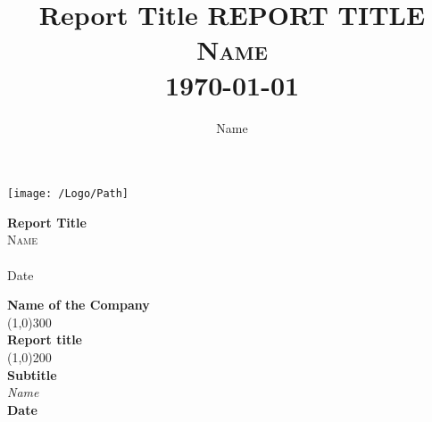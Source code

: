 \documentclass[11pt, oneside]{article}   	%
\title{Report Title}
\author{Name}
\date		%
\begin{document}

\maketitle 


\begin{titlepage}
\begin{center}
\texttt{[image: /Logo/Path]} %
\end{center}
\vspace{2cm}
    \begin{center}
    \huge{\bfseries Report Title}\\
    [3cm] %
    \textsc{\LARGE Name}\\
    \textsc{\Large}\\ 
    [2cm]
    Date
    \end{center}
\vfill

\end{titlepage}


\newpage

\begin{titlepage}
    
\begin{center}

    \textbf{\LARGE Name of the Company}\\
	\line(1,0){300}\\
	[0.30in]
	\huge{\bfseries Report title}\\
	[0.30in]
	\line(1,0){200}\\
    [0.30in]
    \textbf{\LARGE Subtitle}\\
    [0.30in]
    \textit{\Large Name}\\
    [0.50in]
    \textbf{\small Date}
\end{center}


\end{titlepage}



\newpage

\begin{titlepage}

\begin{center}
\title{
		\centering \LARGE \textbf{\uppercase{Report Title}}\\
		[0.5cm]
		\normalsize \textsc{Name}\\
		[0.5cm]
		\normalsize \today \vspace*{5\baselineskip}\\
		
		}
\end{center}



\end{titlepage}
\end{document}
